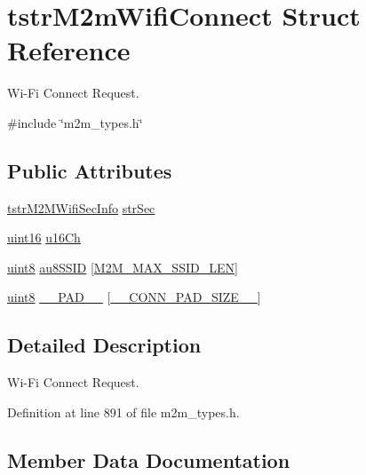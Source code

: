 \hypertarget{structtstrM2mWifiConnect}{}\section{tstr\+M2m\+Wifi\+Connect Struct Reference}
\label{structtstrM2mWifiConnect}


Wi-\/\+Fi Connect Request.  




{\ttfamily \#include \char`\"{}m2m\+\_\+types.\+h\char`\"{}}

\subsection*{Public Attributes}
\begin{DoxyCompactItemize}
\item 
\hyperlink{structtstrM2MWifiSecInfo}{tstr\+M2\+M\+Wifi\+Sec\+Info} \hyperlink{structtstrM2mWifiConnect_a2fa396b7a30634994c27eeda397bbfde}{str\+Sec}
\item 
\hyperlink{group__DataT_ga1daa745171fc6e31d942c161422a76f9}{uint16} \hyperlink{structtstrM2mWifiConnect_acfe42b3cc91f29b734505c22f8240d96}{u16\+Ch}
\item 
\hyperlink{group__DataT_ga4df709a77647e870bbf1d955b8edc9a6}{uint8} \hyperlink{structtstrM2mWifiConnect_a74af255fcf9e3f7db52ccd308359e7d3}{au8\+S\+S\+ID} \mbox{[}\hyperlink{group__WlanDefines_gab2bd95c18ede2fbc07b44c5660cc0097}{M2\+M\+\_\+\+M\+A\+X\+\_\+\+S\+S\+I\+D\+\_\+\+L\+EN}\mbox{]}
\item 
\hyperlink{group__DataT_ga4df709a77647e870bbf1d955b8edc9a6}{uint8} \hyperlink{structtstrM2mWifiConnect_a9b005e37a843557b10c31838a2083a52}{\+\_\+\+\_\+\+P\+A\+D\+\_\+\+\_\+} \mbox{[}\hyperlink{m2m__types_8h_a2970aac9a0bb2054caba2b80a8f04dd4}{\+\_\+\+\_\+\+C\+O\+N\+N\+\_\+\+P\+A\+D\+\_\+\+S\+I\+Z\+E\+\_\+\+\_\+}\mbox{]}
\end{DoxyCompactItemize}


\subsection{Detailed Description}
Wi-\/\+Fi Connect Request. 

Definition at line 891 of file m2m\+\_\+types.\+h.



\subsection{Member Data Documentation}
\mbox{\label{structtstrM2mWifiConnect_a9b005e37a843557b10c31838a2083a52}} 
